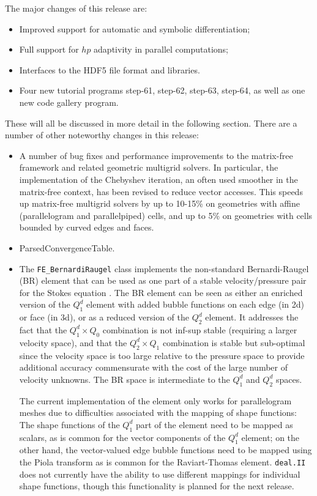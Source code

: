 \documentclass{ansarticle-preprint}
\newcommand{\specialword}[1]{\texttt{#1}}
\newcommand{\dealii}{{\specialword{deal.II}}\xspace}
\begin{document}
The major changes of this release are:
\begin{itemize}
\item Improved support for automatic and symbolic differentiation;
\item Full support for $hp$ adaptivity in parallel computations;
\item Interfaces to the HDF5 file format and libraries.
\item Four new tutorial programs step-61, step-62, step-63, step-64,
  as well as one new code gallery program.
\end{itemize}
These will all be discussed in more detail in the
following section. There are a number of other noteworthy changes in this release:
\begin{itemize}
\item A number of bug fixes and performance improvements to the
  matrix-free framework and related geometric multigrid solvers. In
  particular, the implementation of the Chebyshev iteration, an often
  used smoother in the matrix-free context, has been revised to reduce
  vector accesses. This speeds up matrix-free
  multigrid solvers by up to 10-15\% on geometries with affine
  (parallelogram and parallelpiped) cells, and up to
  5\% on geometries with cells bounded by curved edges and faces.
\item ParsedConvergenceTable.
\item The \texttt{FE\_BernardiRaugel} class implements the
  non-standard Bernardi-Raugel (BR) element that can be used as one part of
  a stable velocity/pressure pair for the Stokes equation
  \cite{BR85}. The BR element can be seen as either an enriched
  version of the $Q_1^d$ element with added bubble functions on each
  edge (in 2d) or face (in 3d), or as a reduced version of the $Q_2^d$
  element. It addresses the fact that the $Q_1^d\times Q_0$
  combination is not inf-sup stable (requiring a larger velocity
  space), and that the $Q_2^d\times Q_1$ combination is stable but
  sub-optimal since the velocity space is too large relative to the
  pressure space to provide additional accuracy commensurate with the
  cost of the large number of velocity unknowns. The BR space is
  intermediate to the $Q_1^d$ and $Q_2^d$ spaces.

  The current implementation of the element only works for
  parallelogram meshes due to difficulties associated with the mapping
  of shape functions: The shape functions of the $Q_1^d$ part of the
  element need to be mapped as scalars, as is common for the vector
  components of the $Q_1^d$ element; on the other hand, the
  vector-valued edge bubble functions need to be mapped using the
  Piola transform as is common for the Raviart-Thomas
  element. \dealii{} does not currently have the ability to use
  different mappings for individual shape functions, though this
  functionality is planned for the next release.


\end{itemize}
\end{document}

